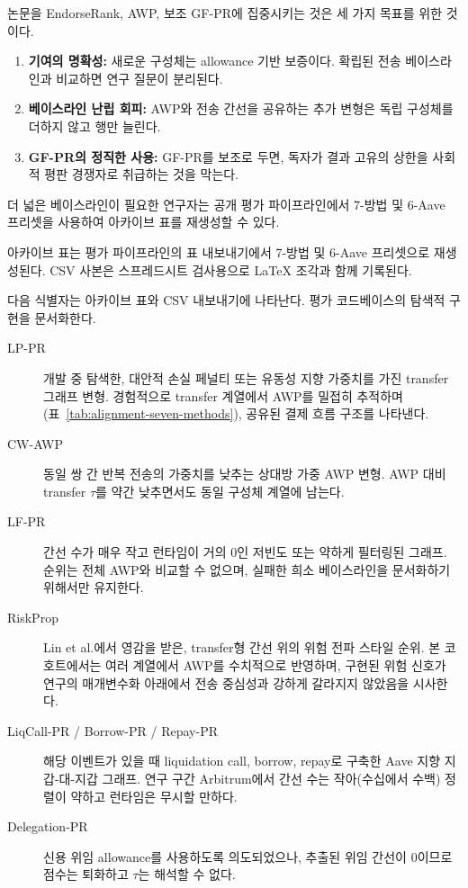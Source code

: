 
논문을 EndorseRank, AWP, 보조 GF-PR에 집중시키는 것은 세 가지 목표를 위한 것이다.

\begin{enumerate}
\item \textbf{기여의 명확성:} 새로운 구성체는 allowance 기반 보증이다. 확립된 전송 베이스라인\citep{16}과 비교하면 연구 질문이 분리된다.
\item \textbf{베이스라인 난립 회피:} AWP와 전송 간선을 공유하는 추가 변형은 독립 구성체를 더하지 않고 행만 늘린다.
\item \textbf{GF-PR의 정직한 사용:} GF-PR를 보조로 두면, 독자가 결과 고유의 상한을 사회적 평판 경쟁자로 취급하는 것을 막는다.
\end{enumerate}

더 넓은 베이스라인이 필요한 연구자는 공개 평가 파이프라인에서 7-방법 및 6-Aave 프리셋을 사용하여 아카이브 표를 재생성할 수 있다.


아카이브 표는 평가 파이프라인의 표 내보내기에서 7-방법 및 6-Aave 프리셋으로 재생성된다. CSV 사본은 스프레드시트 검사용으로 LaTeX 조각과 함께 기록된다.


다음 식별자는 아카이브 표와 CSV 내보내기에 나타난다. 평가 코드베이스의 탐색적 구현을 문서화한다.

\begin{description}
\item[LP-PR] 개발 중 탐색한, 대안적 손실 페널티 또는 유동성 지향 가중치를 가진 transfer 그래프 변형. 경험적으로 transfer 계열에서 AWP를 밀접히 추적하며(표~\ref{tab:alignment-seven-methods}), 공유된 결제 흐름 구조를 나타낸다.
\item[CW-AWP] 동일 쌍 간 반복 전송의 가중치를 낮추는 상대방 가중 AWP 변형. AWP 대비 transfer $\tau$를 약간 낮추면서도 동일 구성체 계열에 남는다.
\item[LF-PR] 간선 수가 매우 작고 런타임이 거의 0인 저빈도 또는 약하게 필터링된 그래프. 순위는 전체 AWP와 비교할 수 없으며, 실패한 희소 베이스라인을 문서화하기 위해서만 유지한다.
\item[RiskProp] Lin et al.\citep{44}에서 영감을 받은, transfer형 간선 위의 위험 전파 스타일 순위. 본 코호트에서는 여러 계열에서 AWP를 수치적으로 반영하며, 구현된 위험 신호가 연구의 매개변수화 아래에서 전송 중심성과 강하게 갈라지지 않았음을 시사한다.
\item[LiqCall-PR / Borrow-PR / Repay-PR] 해당 이벤트가 있을 때 liquidation call, borrow, repay로 구축한 Aave 지향 지갑-대-지갑 그래프. 연구 구간 Arbitrum에서 간선 수는 작아(수십에서 수백) 정렬이 약하고 런타임은 무시할 만하다.
\item[Delegation-PR] 신용 위임 allowance를 사용하도록 의도되었으나, 추출된 위임 간선이 0이므로 점수는 퇴화하고 $\tau$는 해석할 수 없다.
\end{description}

